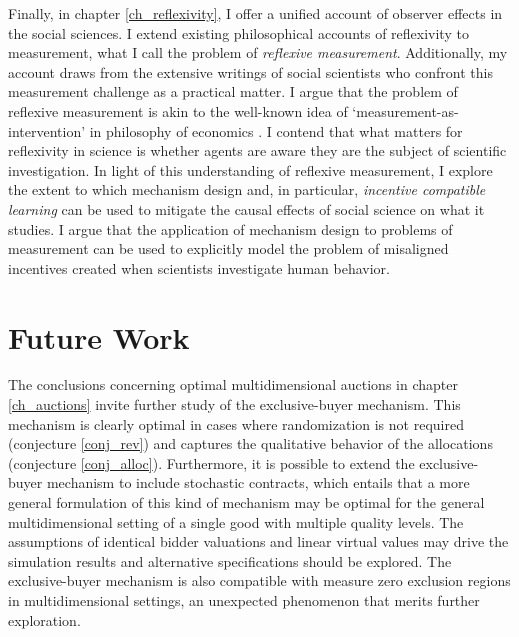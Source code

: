 Finally, in chapter \ref{ch_reflexivity}, I offer a unified account of observer effects in the social sciences. I extend existing philosophical accounts of reflexivity to measurement, what I call the problem of \textit{reflexive measurement}. Additionally, my account draws from the extensive writings of social scientists who confront this measurement challenge as a practical matter. I argue that the problem of reflexive measurement is akin to the well-known idea of `measurement-as-intervention' in philosophy of economics \autocite{morgan2001}. I contend that what matters for reflexivity in science is whether agents are aware they are the subject of scientific investigation. In light of this understanding of reflexive measurement, I explore the extent to which mechanism design and, in particular, \textit{incentive compatible learning} can be used to mitigate the causal effects of social science on what it studies. I argue that the application of mechanism design to problems of measurement can be used to explicitly model the problem of misaligned incentives created when scientists investigate human behavior.








\section{Future Work}

The conclusions concerning optimal multidimensional auctions in chapter \ref{ch_auctions} invite further study of the exclusive-buyer mechanism. This mechanism is clearly optimal in cases where randomization is not required (conjecture \ref{conj_rev}) and captures the qualitative behavior of the allocations (conjecture \ref{conj_alloc}). Furthermore, it is possible to extend the exclusive-buyer mechanism to include stochastic contracts, which entails that a more general formulation of this kind of mechanism may be optimal for the general multidimensional setting of a single good with multiple quality levels. The assumptions of identical bidder valuations and linear virtual values may drive the simulation results and alternative specifications should be explored. The exclusive-buyer mechanism is also compatible with measure zero exclusion regions in multidimensional settings, an unexpected phenomenon that merits further exploration.

